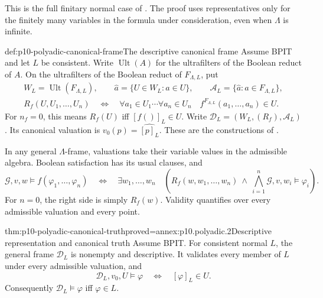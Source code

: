 This is the full finitary normal case of
\cite[preprint Definition~3.11, p.~9, and Theorem~3.13,
pp.~10--11]{Venema2005Preprint}.
The proof uses representatives only for the finitely many variables
in the formula under consideration, even when \(\Lambda\) is infinite.

\begin{hbdefinition}{def:p10-polyadic-canonical-frame}{The descriptive canonical frame}
Assume BPIT and let \(L\) be consistent.
Write \(\operatorname{Ult}(A)\) for the ultrafilters of the Boolean
reduct of \(A\).
On the ultrafilters of
the Boolean reduct of \(F_{\Lambda,L}\), put
\[
\begin{gathered}
 W_L=\operatorname{Ult}(F_{\Lambda,L}),\qquad
 \widehat a=\{U\in W_L:a\in U\},\qquad
 \mathcal A_L=\{\widehat a:a\in F_{\Lambda,L}\},\\
 R_f(U,U_1,\ldots,U_n)
 \quad\Longleftrightarrow\quad
 \forall a_1\in U_1\cdots\forall a_n\in U_n\quad
                f^{F_{\Lambda,L}}(a_1,\ldots,a_n)\in U.
\end{gathered}
\]
For \(n_f=0\), this means \(R_f(U)\) iff \([f()]_L\in U\).
Write \(\mathcal D_L=(W_L,(R_f),\mathcal A_L)\).
Its canonical valuation is \(v_0(p)=\widehat{[p]_L}\).
These are the constructions of
\cite[preprint Definition~5.12, p.~19, and Definition~5.24,
p.~22]{Venema2005Preprint}.

In any general \(\Lambda\)-frame, valuations take their variable
values in the admissible algebra.  Boolean satisfaction has its usual
clauses, and
\[
 \mathcal G,v,w\models f(\varphi_1,\ldots,\varphi_n)
 \quad\Longleftrightarrow\quad
 \exists w_1,\ldots,w_n\quad
 \left(R_f(w,w_1,\ldots,w_n)\ \land\
       \bigwedge_{i=1}^n\mathcal G,v,w_i\models\varphi_i\right).
\]
For \(n=0\), the right side is simply \(R_f(w)\).
Validity quantifies over every admissible valuation and every point.
\end{hbdefinition}

\begin{hbtheorem}{thm:p10-polyadic-canonical-truth}{proved=annex:p10.polyadic.2}{Descriptive representation and canonical truth}
Assume BPIT.  For consistent normal \(L\), the general frame
\(\mathcal D_L\) is nonempty and descriptive.
It validates every member of \(L\) under every admissible valuation,
and
\[
 \mathcal D_L,v_0,U\models\varphi
       \quad\Longleftrightarrow\quad [\varphi]_L\in U.
\]
Consequently \(\mathcal D_L\models\varphi\) iff \(\varphi\in L\).
\end{hbtheorem}

